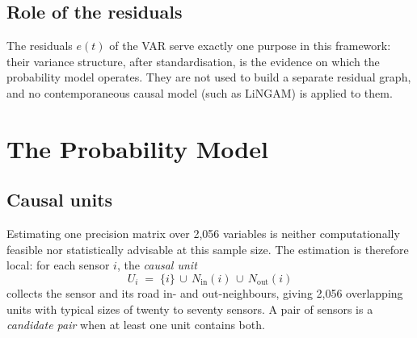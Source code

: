 \documentclass[MTech]{ugthesis}
\begin{document}
\subsection{Role of the residuals}
The residuals $e(t)$ of the VAR serve exactly one purpose in this framework: their variance structure, after standardisation, is the evidence on which the probability model operates. They are not used to build a separate residual graph, and no contemporaneous causal model (such as LiNGAM) is applied to them.

\section{The Probability Model}
\label{sec:pem}

\subsection{Causal units}
\label{sec:units}
Estimating one precision matrix over 2,056 variables is neither computationally feasible nor statistically advisable at this sample size. The estimation is therefore local: for each sensor $i$, the \emph{causal unit}
\begin{equation}
U_i \;=\; \{i\} \,\cup\, N_{\mathrm{in}}(i) \,\cup\, N_{\mathrm{out}}(i)
\label{eq:unit}
\end{equation}
collects the sensor and its road in- and out-neighbours, giving 2,056 overlapping units with typical sizes of twenty to seventy sensors. A pair of sensors is a \emph{candidate pair} when at least one unit contains both.
\end{document}
